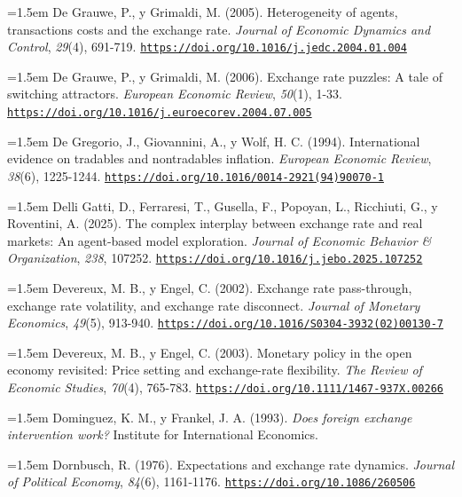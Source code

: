 \documentclass[10pt,a4paper]{article}
\begin{document}
\noindent\hangindent=1.5em De Grauwe, P., y Grimaldi, M. (2005). Heterogeneity of agents, transactions costs and the exchange rate. \textit{Journal of Economic Dynamics and Control}, \textit{29}(4), 691-719. \href{https://doi.org/10.1016/j.jedc.2004.01.004}{\nolinkurl{https://doi.org/10.1016/j.jedc.2004.01.004}}

\noindent\hangindent=1.5em De Grauwe, P., y Grimaldi, M. (2006). Exchange rate puzzles: A tale of switching attractors. \textit{European Economic Review}, \textit{50}(1), 1-33. \href{https://doi.org/10.1016/j.euroecorev.2004.07.005}{\nolinkurl{https://doi.org/10.1016/j.euroecorev.2004.07.005}}

\noindent\hangindent=1.5em De Gregorio, J., Giovannini, A., y Wolf, H. C. (1994). International evidence on tradables and nontradables inflation. \textit{European Economic Review}, \textit{38}(6), 1225-1244. \href{https://doi.org/10.1016/0014-2921(94)90070-1}{\nolinkurl{https://doi.org/10.1016/0014-2921(94)90070-1}}

\noindent\hangindent=1.5em Delli Gatti, D., Ferraresi, T., Gusella, F., Popoyan, L., Ricchiuti, G., y Roventini, A. (2025). The complex interplay between exchange rate and real markets: An agent-based model exploration. \textit{Journal of Economic Behavior \& Organization}, \textit{238}, 107252. \href{https://doi.org/10.1016/j.jebo.2025.107252}{\nolinkurl{https://doi.org/10.1016/j.jebo.2025.107252}}

\noindent\hangindent=1.5em Devereux, M. B., y Engel, C. (2002). Exchange rate pass-through, exchange rate volatility, and exchange rate disconnect. \textit{Journal of Monetary Economics}, \textit{49}(5), 913-940. \href{https://doi.org/10.1016/S0304-3932(02)00130-7}{\nolinkurl{https://doi.org/10.1016/S0304-3932(02)00130-7}}

\noindent\hangindent=1.5em Devereux, M. B., y Engel, C. (2003). Monetary policy in the open economy revisited: Price setting and exchange-rate flexibility. \textit{The Review of Economic Studies}, \textit{70}(4), 765-783. \href{https://doi.org/10.1111/1467-937X.00266}{\nolinkurl{https://doi.org/10.1111/1467-937X.00266}}

\noindent\hangindent=1.5em Dominguez, K. M., y Frankel, J. A. (1993). \textit{Does foreign exchange intervention work?} Institute for International Economics.

\noindent\hangindent=1.5em Dornbusch, R. (1976). Expectations and exchange rate dynamics. \textit{Journal of Political Economy}, \textit{84}(6), 1161-1176. \href{https://doi.org/10.1086/260506}{\nolinkurl{https://doi.org/10.1086/260506}}
\end{document}
